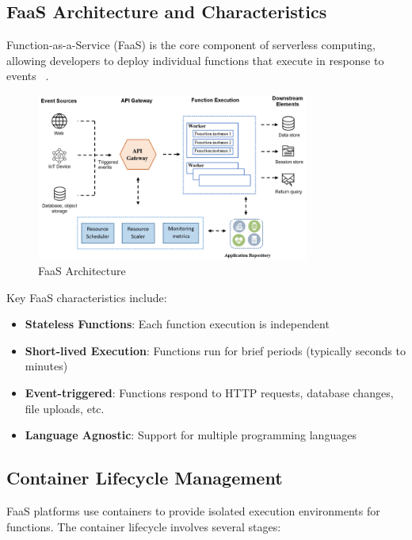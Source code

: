 \subsection{FaaS Architecture and Characteristics}

Function-as-a-Service (FaaS) is the core component of serverless computing, allowing developers to deploy individual functions that execute in response to events ~\cite{mampage2021cloudsimsc}.

\begin{figure}[h]
    \centering
    \includegraphics[width=0.8\textwidth]{assets/Serverless-Architecture.png}
    \caption{FaaS Architecture ~\cite{mampage2021holistic}}
    \label{fig:faas_architecture}
\end{figure}


Key FaaS characteristics include:
\begin{itemize}
    \item \textbf{Stateless Functions}: Each function execution is independent
    \item \textbf{Short-lived Execution}: Functions run for brief periods (typically seconds to minutes)
    \item \textbf{Event-triggered}: Functions respond to HTTP requests, database changes, file uploads, etc.
    \item \textbf{Language Agnostic}: Support for multiple programming languages
\end{itemize}

\subsection{Container Lifecycle Management}

FaaS platforms use containers to provide isolated execution environments for functions. The container lifecycle involves several stages:

